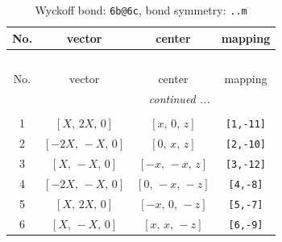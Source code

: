 \documentclass[fleqn,8pt]{jsarticle}
\begin{document}
\begin{longtable}{cccc}
\caption{Wyckoff bond: {\tt 6b@6c}, bond symmetry: {\tt ..m}}
 \\
 \hline \hline
No. & vector & center & mapping \\ \hline \endfirsthead

\multicolumn{3}{l}{\tablename\ \thetable{}} \\
 \hline \hline
No. & vector & center & mapping \\ \hline \endhead

 \hline \hline
\multicolumn{3}{r}{\footnotesize\it continued ...} \\ \endfoot

 \hline \hline
\multicolumn{3}{r}{} \\ \endlastfoot

1 & $\left[ X,\, 2 X,\, 0 \right]$ & $\left[ x,\, 0,\, z \right]$ & {\tt [1,-11]} \\ \hline
2 & $\left[ - 2 X,\, - X,\, 0 \right]$ & $\left[ 0,\, x,\, z \right]$ & {\tt [2,-10]} \\ \hline
3 & $\left[ X,\, - X,\, 0 \right]$ & $\left[ - x,\, - x,\, z \right]$ & {\tt [3,-12]} \\ \hline
4 & $\left[ - 2 X,\, - X,\, 0 \right]$ & $\left[ 0,\, - x,\, - z \right]$ & {\tt [4,-8]} \\ \hline
5 & $\left[ X,\, 2 X,\, 0 \right]$ & $\left[ - x,\, 0,\, - z \right]$ & {\tt [5,-7]} \\ \hline
6 & $\left[ X,\, - X,\, 0 \right]$ & $\left[ x,\, x,\, - z \right]$ & {\tt [6,-9]} \\
\end{longtable}
\renewcommand{\arraystretch}{1.2}
\end{document}
